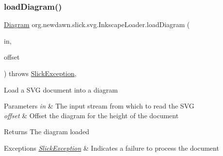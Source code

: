 \subsubsection{\texorpdfstring{load\+Diagram()}{loadDiagram()}\hspace{0.1cm}{\footnotesize\ttfamily [2/2]}}
{\footnotesize\ttfamily \mbox{\hyperlink{classorg_1_1newdawn_1_1slick_1_1svg_1_1_diagram}{Diagram}} org.\+newdawn.\+slick.\+svg.\+Inkscape\+Loader.\+load\+Diagram (\begin{DoxyParamCaption}\item[{Input\+Stream}]{in,  }\item[{boolean}]{offset }\end{DoxyParamCaption}) throws \mbox{\hyperlink{classorg_1_1newdawn_1_1slick_1_1_slick_exception}{Slick\+Exception}}\hspace{0.3cm}{\ttfamily [inline]}, {\ttfamily [private]}}

Load a S\+VG document into a diagram


\begin{DoxyParams}{Parameters}
{\em in} & The input stream from which to read the S\+VG \\
\hline
{\em offset} & Offset the diagram for the height of the document \\
\hline
\end{DoxyParams}
\begin{DoxyReturn}{Returns}
The diagram loaded 
\end{DoxyReturn}

\begin{DoxyExceptions}{Exceptions}
{\em \mbox{\hyperlink{classorg_1_1newdawn_1_1slick_1_1_slick_exception}{Slick\+Exception}}} & Indicates a failure to process the document \\
\hline
\end{DoxyExceptions}

